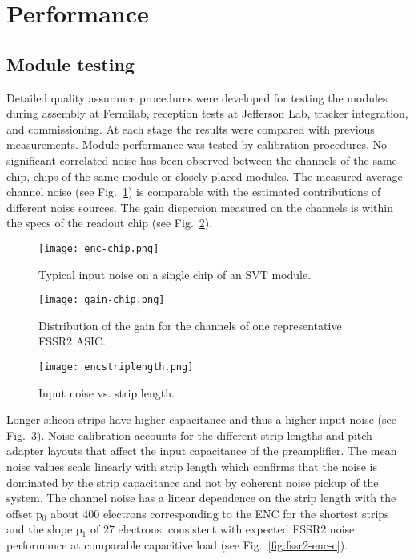 \section{Performance}

\subsection{Module testing}

Detailed quality assurance procedures were developed for testing the modules during assembly at Fermilab, reception tests at Jefferson Lab, tracker integration, and commissioning. At each stage the results were compared with previous measurements. Module performance was tested by calibration procedures. No significant correlated noise has been observed between the channels of the same chip, chips of the same module or closely placed modules. The measured average channel noise (see Fig.~\ref{fig:enc-chip}) is comparable with the estimated contributions of different noise sources. The gain dispersion measured on the channels is within the specs of the readout chip (see Fig.~\ref{fig:gain-chip}).

\begin{figure}[hbt] 
\centering 
\texttt{[image: enc-chip.png]}
\caption{Typical input noise on a single chip of an SVT module.}
\label{fig:enc-chip}
\end{figure} 

\begin{figure}[hbt] 
\centering 
\texttt{[image: gain-chip.png]}
\caption{Distribution of the gain for the channels of one representative FSSR2 ASIC.}
\label{fig:gain-chip}
\end{figure}

\begin{figure}[hbt] 
	\centering 
	\texttt{[image: encstriplength.png]}
	\caption{Input noise vs. strip length.}
	\label{fig:encstriplength}
\end{figure}

Longer silicon strips have higher capacitance and thus a higher input noise (see Fig.~\ref{fig:encstriplength}). Noise calibration accounts for the different strip lengths and pitch adapter layouts that affect the input capacitance of the preamplifier. The mean noise values scale linearly with strip length which confirms that the noise is dominated by the strip capacitance and not by coherent noise pickup of the system. The channel noise has a linear dependence on the strip length with the offset p$_{0}$ about 400 electrons corresponding to the ENC for the shortest strips and the slope p$_1$ of 27 electrons, consistent with expected FSSR2 noise performance at comparable capacitive load (see Fig.~\ref{fig:fssr2-enc-c}).

